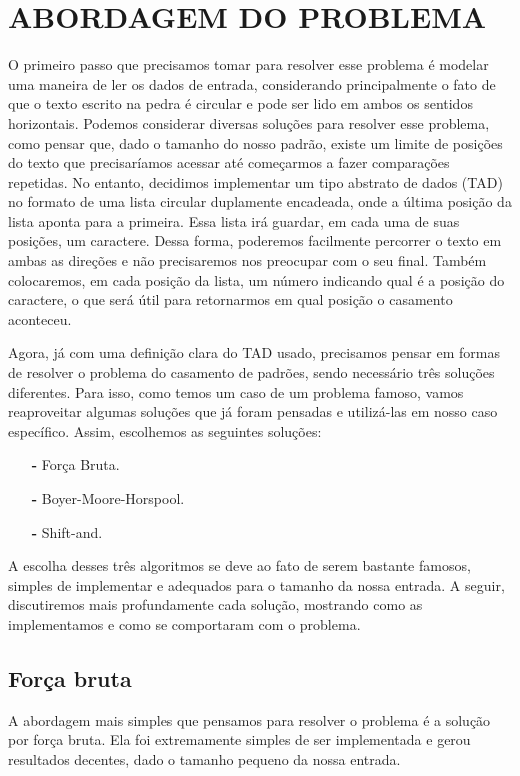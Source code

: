 \documentclass[12pt]{article}
\begin{document}
    \section{ABORDAGEM DO PROBLEMA}
        O primeiro passo que precisamos tomar para resolver esse problema é modelar uma maneira de ler 
        os dados de entrada, considerando principalmente o fato de que o texto escrito na pedra é 
        circular e pode ser lido em ambos os sentidos horizontais. Podemos considerar diversas soluções 
        para resolver esse problema, como pensar que, dado o tamanho do nosso padrão, existe um limite 
        de posições do texto que precisaríamos acessar até começarmos a fazer comparações repetidas. 
        No entanto, decidimos implementar um tipo abstrato de dados (TAD) no formato de uma lista circular 
        duplamente encadeada, onde a última posição da lista aponta para a primeira. Essa lista irá guardar, 
        em cada uma de suas posições, um caractere. Dessa forma, poderemos facilmente percorrer o texto 
        em ambas as direções e não precisaremos nos preocupar com o seu final. Também colocaremos, em 
        cada posição da lista, um número indicando qual é a posição do caractere, o que será útil para 
        retornarmos em qual posição o casamento aconteceu.

        Agora, já com uma definição clara do TAD usado, precisamos pensar em formas de resolver o problema 
        do casamento de padrões, sendo necessário três soluções diferentes. Para isso, como temos um caso 
        de um problema famoso, vamos reaproveitar algumas soluções que já foram pensadas e utilizá-las em 
        nosso caso específico. Assim, escolhemos as seguintes soluções:
        \begin{itemize}
            \item[\textbf{-}] Força Bruta.
            \item[\textbf{-}] Boyer-Moore-Horspool.
            \item[\textbf{-}] Shift-and.
        \end{itemize}
        
        A escolha desses três algoritmos se deve ao fato de serem bastante famosos, simples de implementar 
        e adequados para o tamanho da nossa entrada. A seguir, discutiremos mais profundamente cada solução, 
        mostrando como as implementamos e como se comportaram com o problema.
        
        \subsection{Força bruta}
            A abordagem mais simples que pensamos para resolver o problema é a solução por força bruta. 
            Ela foi extremamente simples de ser implementada e gerou resultados decentes, dado o tamanho 
            pequeno da nossa entrada.
\end{document}
